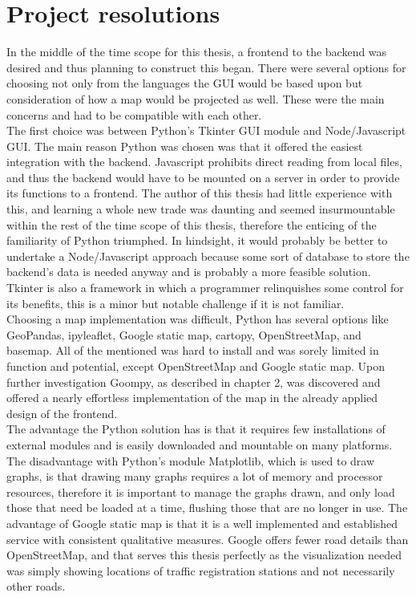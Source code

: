\section{Project resolutions}
In the middle of the time scope for this thesis, a frontend to the backend was desired and thus planning to construct this began. There were several options for choosing not only from the languages the GUI would be based upon but consideration of how a map would be projected as well. These were the main concerns and had to be compatible with each other.
\\
The first choice was between Python's Tkinter GUI module and Node/Javascript GUI. The main reason Python was chosen was that it offered the easiest integration with the backend. Javascript prohibits direct reading from local files, and thus the backend would have to be mounted on a server in order to provide its functions to a frontend. The author of this thesis had little experience with this, and learning a whole new trade was daunting and seemed insurmountable within the rest of the time scope of this thesis, therefore the enticing of the familiarity of Python triumphed. In hindsight, it would probably be better to undertake a Node/Javascript approach because some sort of database to store the backend's data is needed anyway and is probably a more feasible solution. Tkinter is also a framework in which a programmer relinquishes some control for its benefits, this is a minor but notable challenge if it is not familiar.
\\
Choosing a map implementation was difficult, Python has several options like GeoPandas, ipyleaflet, Google static map, cartopy, OpenStreetMap, and basemap. All of the mentioned was hard to install and was sorely limited in function and potential, except OpenStreetMap and Google static map. Upon further investigation Goompy, as described in chapter 2, was discovered and offered a nearly effortless implementation of the map in the already applied design of the frontend.
\\
The advantage the Python solution has is that it requires few installations of external modules and is easily downloaded and mountable on many platforms.
The disadvantage with Python's module Matplotlib, which is used to draw graphs, is that drawing many graphs requires a lot of memory and processor resources, therefore it is important to manage the graphs drawn, and only load those that need be loaded at a time, flushing those that are no longer in use.
The advantage of Google static map is that it is a well implemented and established service with consistent qualitative measures. Google offers fewer road details than OpenStreetMap, and that serves this thesis perfectly as the visualization needed was simply showing locations of traffic registration stations and not necessarily other roads. 
